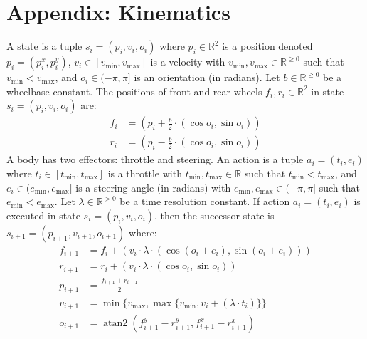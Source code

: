 \documentclass[10pt]{article}
\theoremstyle{plain}
\DeclareMathOperator*{\atantwo}{atan2}
\begin{document}
\section*{Appendix: Kinematics}
A state is a tuple $s_{i} = (p_{i}, v_{i}, o_{i})$ where
$p_{i} \in \mathbb{R}^{2}$ is a position denoted $p_{i} = (p_{i}^{x}, p_{i}^{y})$,
$v_{i} \in [v_{\min}, v_{\max}]$ is a velocity with $v_{\min}, v_{\max} \in \mathbb{R}^{\ge 0}$ such that $v_{\min} < v_{\max}$,
and $o_{i} \in (-\pi, \pi]$ is an orientation (in radians).
Let $b \in \mathbb{R}^{\ge 0}$ be a wheelbase constant.
The positions of front and rear wheels $f_{i}, r_{i} \in \mathbb{R}^{2}$ in state $s_{i} = (p_{i}, v_{i}, o_{i})$ are:
\begin{align}
    f_{i} & = \left( p_{i} + \frac{b}{2} \cdot (\cos{o_{i}}, \sin{o_{i}}) \right) \label{equation:kinematics_first} \\
    r_{i} & = \left( p_{i} - \frac{b}{2} \cdot \left( \cos{o_{i}}, \sin{o_{i}} \right) \right)
\end{align}
A body has two effectors: throttle and steering.
An action is a tuple $a_{i} = (t_{i}, e_{i})$ where
$t_{i} \in [t_{\min}, t_{\max}]$ is a throttle with $t_{\min}, t_{\max} \in \mathbb{R}$ such that $t_{\min} < t_{\max}$,
and $e_{i} \in (e_{\min}, e_{\max}]$ is a steering angle (in radians) with $e_{\min}, e_{\max} \in (-\pi, \pi]$ such that $e_{\min} < e_{\max}$.
Let $\lambda \in \mathbb{R}^{> 0}$ be a time resolution constant.
If action $a_{i} = (t_{i}, e_{i})$ is executed in state $s_{i} = (p_{i}, v_{i}, o_{i})$, then the successor state is $s_{i+1} = (p_{i+1}, v_{i+1}, o_{i+1})$ where:
\begin{align}
    f_{i+1} & = f_{i} + \left( v_{i} \cdot \lambda \cdot \left( \cos{(o_{i} + e_{i})}, \sin{(o_{i} + e_{i})} \right) \right) \\
    r_{i+1} & = r_{i} + \left( v_{i} \cdot \lambda \cdot \left( \cos{o_{i}}, \sin{o_{i}} \right) \right) \\
    p_{i+1} & = \frac{f_{i+1} + r_{i+1}}{2}  \\
    v_{i+1} & = \min\{ v_{\max}, \max\{ v_{\min}, v_{i} + \left( \lambda \cdot t_{i} \right) \} \} \\
    o_{i+1} & = \atantwo{ \left( f_{i+1}^{y} - r_{i+1}^{y}, f_{i+1}^{x} - r_{i+1}^{x} \right) } \label{equation:kinematics_last}
\end{align}
\end{document}
